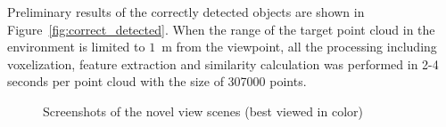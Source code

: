 \documentclass[letterpaper, 10 pt, conference]{sty/ieeeconf}
\begin{document}
Preliminary results of the correctly detected objects are shown in Figure~\ref{fig:correct_detected}. 
When the range of the target point cloud in the environment is limited to $1$~m from the viewpoint, 
all the processing including voxelization, feature extraction and similarity calculation was performed 
in 2-4 seconds per point cloud with the size of 307000 points.


\begin{figure}[tb!]
  \centering
 \caption{Screenshots of the novel view scenes (best viewed in color) }
 \label{fig:novel_views}
\end{figure}
\end{document}
